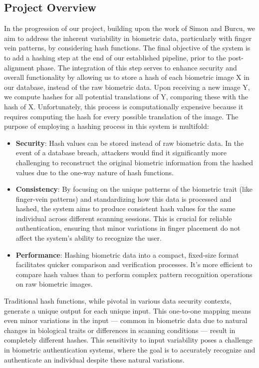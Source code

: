 \subsection{Project Overview}

In the progression of our project, building upon the work of Simon and Burcu, we aim to address the inherent variability in biometric data, particularly with finger vein patterns, by considering hash functions. The final objective of the system is to add a hashing step at the end of our established pipeline, prior to the post-alignment phase. The integration of this step serves to enhance security and overall functionality by allowing us to store a hash of each biometric image X in our database, instead of the raw biometric data. Upon receiving a new image Y, we compute hashes for all potential translations of Y, comparing these with the hash of X. Unfortunately, this process is computationally expensive because it requires computing the hash for every possible translation of the image. The purpose of employing a hashing process in this system is multifold:

\begin{itemize}
    \item \textbf{Security}: Hash values can be stored instead of raw biometric data. In the event of a database breach, attackers would find it significantly more challenging to reconstruct the original biometric information from the hashed values due to the one-way nature of hash functions.

    \item \textbf{Consistency}: By focusing on the unique patterns of the biometric trait (like finger-vein patterns) and standardizing how this data is processed and hashed, the system aims to produce consistent hash values for the same individual across different scanning sessions. This is crucial for reliable authentication, ensuring that minor variations in finger placement do not affect the system's ability to recognize the user.

    \item \textbf{Performance}: Hashing biometric data into a compact, fixed-size format facilitates quicker comparison and verification processes. It's more efficient to compare hash values than to perform complex pattern recognition operations on raw biometric images.
\end{itemize}

Traditional hash functions, while pivotal in various data security contexts, generate a unique output for each unique input. This one-to-one mapping means even minor variations in the input — common in biometric data due to natural changes in biological traits or differences in scanning conditions — result in completely different hashes. This sensitivity to input variability poses a challenge in biometric authentication systems, where the goal is to accurately recognize and authenticate an individual despite these natural variations.

